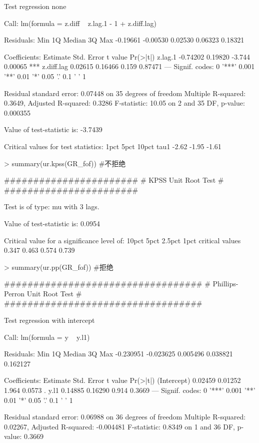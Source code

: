 \documentclass{article}
\begin{document}
\begin{Schunk}
\begin{Soutput}
Test regression none 


Call:
lm(formula = z.diff ~ z.lag.1 - 1 + z.diff.lag)

Residuals:
     Min       1Q   Median       3Q      Max 
-0.19661 -0.00530  0.02530  0.06323  0.18321 

Coefficients:
           Estimate Std. Error t value Pr(>|t|)    
z.lag.1    -0.74202    0.19820  -3.744  0.00065 ***
z.diff.lag  0.02615    0.16466   0.159  0.87471    
---
Signif. codes:  0 '***' 0.001 '**' 0.01 '*' 0.05 '.' 0.1 ' ' 1

Residual standard error: 0.07448 on 35 degrees of freedom
Multiple R-squared:  0.3649,	Adjusted R-squared:  0.3286 
F-statistic: 10.05 on 2 and 35 DF,  p-value: 0.000355


Value of test-statistic is: -3.7439 

Critical values for test statistics: 
      1pct  5pct 10pct
tau1 -2.62 -1.95 -1.61
\end{Soutput}
\begin{Sinput}
> summary(ur.kpss(GR_fof)) #不拒绝
\end{Sinput}
\begin{Soutput}
####################### 
# KPSS Unit Root Test # 
####################### 

Test is of type: mu with 3 lags. 

Value of test-statistic is: 0.0954 

Critical value for a significance level of: 
                10pct  5pct 2.5pct  1pct
critical values 0.347 0.463  0.574 0.739
\end{Soutput}
\begin{Sinput}
> summary(ur.pp(GR_fof)) #拒绝
\end{Sinput}
\begin{Soutput}
################################## 
# Phillips-Perron Unit Root Test # 
################################## 

Test regression with intercept 


Call:
lm(formula = y ~ y.l1)

Residuals:
      Min        1Q    Median        3Q       Max 
-0.230951 -0.023625  0.005496  0.038821  0.162127 

Coefficients:
            Estimate Std. Error t value Pr(>|t|)  
(Intercept)  0.02459    0.01252   1.964   0.0573 .
y.l1         0.14885    0.16290   0.914   0.3669  
---
Signif. codes:  0 '***' 0.001 '**' 0.01 '*' 0.05 '.' 0.1 ' ' 1

Residual standard error: 0.06988 on 36 degrees of freedom
Multiple R-squared:  0.02267,	Adjusted R-squared:  -0.004481 
F-statistic: 0.8349 on 1 and 36 DF,  p-value: 0.3669



\end{Soutput}
\end{Schunk}
\end{document}
